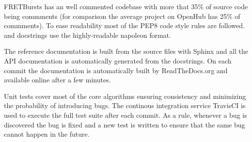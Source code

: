
FRETBursts has an well commented codebase with more that 35\% of source code
being commments (for comparison the average project on OpenHub has 25\%
of commments). To ease readability most of the PEP8 code style rules are followed.
and docstrings use the highly-readable napoleon format.

The reference documentation is built from the source files with Sphinx and
all the API documentation is automatically generated from the docstrings.
On each commit the documentation is automatically built by ReadTheDocs.org
and available online after a few minutes.

Unit tests cover most of the core algorithms ensuring consistency and 
minimizing the probability of introducing bugs. The continous integration
service TravisCI is used to execute the full test suite after each commit.
As a rule, whenever a bug is discovered the bug is fixed and a new test is 
written to ensure that the same bug cannot happen in the future.

